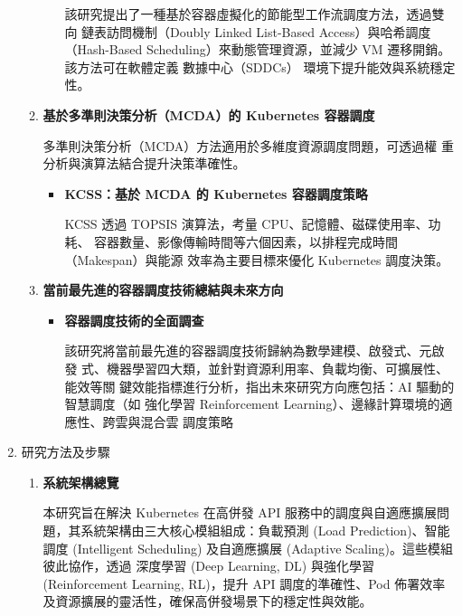 \documentclass[12pt,a4paper]{article}
\begin{document}
\begin{enumerate}[label={(\zhdig*)}, leftmargin=2\parindent, listparindent=\parindent]
\begin{enumerate}[label={(\arabic*)}, leftmargin=\parindent, listparindent=\parindent]
\begin{itemize}[leftmargin=\parindent, listparindent=\parindent]
該研究提出了一種基於容器虛擬化的節能型工作流調度方法，透過雙向
鏈表訪問機制（Doubly Linked List-Based Access）與哈希調度（Hash-Based
Scheduling）來動態管理資源，並減少 VM 遷移開銷。該方法可在軟體定義
數據中心（SDDCs） 環境下提升能效與系統穩定性。

    \end{itemize}
    \item \textbf{
基於多準則決策分析（MCDA）的 Kubernetes 容器調度
}

多準則決策分析（MCDA）方法適用於多維度資源調度問題，可透過權
重分析與演算法結合提升決策準確性。
\begin{itemize}[leftmargin=\parindent, listparindent=\parindent]
    \item \textbf{
\cite{16} KCSS：基於 MCDA 的 Kubernetes 容器調度策略
    }

KCSS 透過 TOPSIS 演算法，考量 CPU、記憶體、磁碟使用率、功耗、
容器數量、影像傳輸時間等六個因素，以排程完成時間（Makespan）與能源
效率為主要目標來優化 Kubernetes 調度決策。

    \end{itemize}
    \item \textbf{
當前最先進的容器調度技術總結與未來方向
}
    \begin{itemize}[leftmargin=\parindent, listparindent=\parindent]
        \item\textbf{
\cite{17} 容器調度技術的全面調查
}

該研究將當前最先進的容器調度技術歸納為數學建模、啟發式、元啟發
式、機器學習四大類，並針對資源利用率、負載均衡、可擴展性、能效等關
鍵效能指標進行分析，指出未來研究方向應包括：AI 驅動的智慧調度（如
強化學習 Reinforcement Learning）、邊緣計算環境的適應性、跨雲與混合雲
調度策略

        \end{itemize}
\end{enumerate}
\item 研究方法及步驟
\begin{enumerate}[label={(\arabic*)}, leftmargin=\parindent, listparindent=\parindent]

\item \textbf{
系統架構總覽
}

本研究旨在解決 Kubernetes 在高併發 API 服務中的調度與自適應擴展問題，其系統架構由三大核心模組組成：負載預測 (Load Prediction)、智能調度 (Intelligent Scheduling) 及自適應擴展 (Adaptive Scaling)。這些模組彼此協作，透過 深度學習 (Deep Learning, DL) 與強化學習 (Reinforcement Learning, RL)，提升 API 調度的準確性、Pod 佈署效率及資源擴展的靈活性，確保高併發場景下的穩定性與效能。


\end{enumerate}
\end{enumerate}
\end{document}

